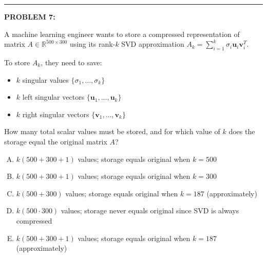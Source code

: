 \documentclass[12pt]{amsart}
\newcommand{\divider}{
  \vspace{-1em} %
  \noindent
  \raisebox{-0.15ex}{\textbullet}%
  \hspace{0.5em}%
  \rule[0.5ex]{0.95\textwidth}{1.0pt}%
  \hspace{0.5em}%
  \raisebox{-0.15ex}{\textbullet}%
  \vspace{0em} %
}
\begin{document}
\divider

{\bf PROBLEM 7:}

A machine learning engineer wants to store a compressed representation of matrix $A \in \mathbb{R}^{500 \times 300}$ using its rank-$k$ SVD approximation $A_k = \sum_{i=1}^k \sigma_i \mathbf{u}_i\mathbf{v}_i^T$.

To store $A_k$, they need to save:
\begin{itemize}
\item $k$ singular values $\{\sigma_1, \ldots, \sigma_k\}$
\item $k$ left singular vectors $\{\mathbf{u}_1, \ldots, \mathbf{u}_k\}$
\item $k$ right singular vectors $\{\mathbf{v}_1, \ldots, \mathbf{v}_k\}$
\end{itemize}

How many total scalar values must be stored, and for which value of $k$ does the storage equal the original matrix $A$?

\begin{enumerate}[(A)]
\item $k(500 + 300 + 1)$ values; storage equals original when $k = 500$
\item $k(500 + 300 + 1)$ values; storage equals original when $k = 300$
\item $k(500 + 300)$ values; storage equals original when $k = 187$ (approximately)
\item $k(500 \cdot 300)$ values; storage never equals original since SVD is always compressed
\item $k(500 + 300 + 1)$ values; storage equals original when $k = 187$ (approximately)
\end{enumerate}
\end{document}
